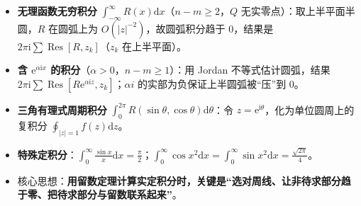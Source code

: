 \begin{itemize}
\tightlist
\item
  \textbf{无理函数无穷积分}
  \(\int_{-\infty}^{\infty}R(x)\mathrm dx\)（\(n-m\ge2\)，\(Q\)
  无实零点）：取上半平面半圆，\(R\) 在圆弧上为
  \(O(|z|^{-2})\)，故圆弧积分趋于 \(0\)，结果是
  \(2\pi\mathrm i\sum\operatorname{Res}[R,z_k]\)（\(z_k\) 在上半平面）。
\item
  \textbf{含 \(\mathrm e^{\alpha\mathrm i x}\)
  的积分}（\(\alpha>0\)，\(n-m\ge1\)）：用 Jordan 不等式估计圆弧，结果
  \(2\pi\mathrm i\sum\operatorname{Res}[R\mathrm e^{\alpha\mathrm i z},z_k]\)；\(\alpha i\)
  的实部为负保证上半圆弧被``压''到 \(0\)。
\item
  \textbf{三角有理式周期积分}
  \(\int_0^{2\pi}R(\sin\theta,\cos\theta)\mathrm d\theta\)：令
  \(z=\mathrm e^{\mathrm i\theta}\)，化为单位圆周上的复积分
  \(\oint_{|z|=1}f(z)\mathrm dz\)。
\item
  \textbf{特殊定积分}：\(\int_0^\infty\frac{\sin x}{x}\mathrm dx=\frac{\pi}{2}\)；\(\int_0^\infty\cos x^2\mathrm dx=\int_0^\infty\sin x^2\mathrm dx=\frac{\sqrt{2\pi}}{4}\)。
\item
  核心思想：\textbf{用留数定理计算实定积分时，关键是``选对周线、让非待求部分趋于零、把待求部分与留数联系起来''}。
\end{itemize}

\newpage
